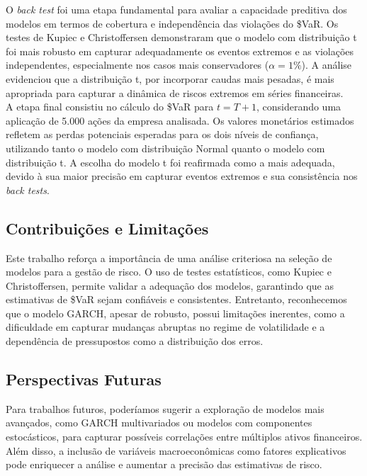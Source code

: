 \documentclass[a4paper, 12pt]{article}
\begin{document}
O \emph{back test} foi uma etapa fundamental para avaliar a capacidade preditiva dos modelos em termos de cobertura e independência das violações do \$VaR. Os testes de Kupiec e Christoffersen demonstraram que o modelo com distribuição t foi mais robusto em capturar adequadamente os eventos extremos e as violações independentes, especialmente nos casos mais conservadores (\(\alpha = 1\%\)). A análise evidenciou que a distribuição t, por incorporar caudas mais pesadas, é mais apropriada para capturar a dinâmica de riscos extremos em séries financeiras.\\


A etapa final consistiu no cálculo do \$VaR para \(t = T+1\), considerando uma aplicação de 5.000 ações da empresa analisada. Os valores monetários estimados refletem as perdas potenciais esperadas para os dois níveis de confiança, utilizando tanto o modelo com distribuição Normal quanto o modelo com distribuição t. A escolha do modelo t foi reafirmada como a mais adequada, devido à sua maior precisão em capturar eventos extremos e sua consistência nos \emph{back tests}.

\subsection{Contribuições e Limitações}

Este trabalho reforça a importância de uma análise criteriosa na seleção de modelos para a gestão de risco. O uso de testes estatísticos, como Kupiec e Christoffersen, permite validar a adequação dos modelos, garantindo que as estimativas de \$VaR sejam confiáveis e consistentes. Entretanto, reconhecemos que o modelo GARCH, apesar de robusto, possui limitações inerentes, como a dificuldade em capturar mudanças abruptas no regime de volatilidade e a dependência de pressupostos como a distribuição dos erros.

\subsection{Perspectivas Futuras}

Para trabalhos futuros, poderíamos sugerir a exploração de modelos mais avançados, como GARCH multivariados ou modelos com componentes estocásticos, para capturar possíveis correlações entre múltiplos ativos financeiros. Além disso, a inclusão de variáveis macroeconômicas como fatores explicativos pode enriquecer a análise e aumentar a precisão das estimativas de risco.
\end{document}
